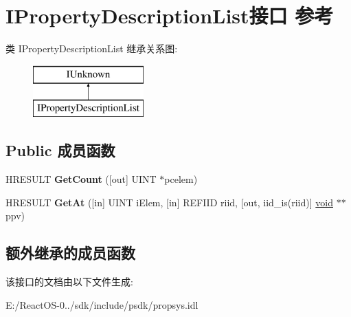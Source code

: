 \hypertarget{interface_i_property_description_list}{}\section{I\+Property\+Description\+List接口 参考}
\label{interface_i_property_description_list}
类 I\+Property\+Description\+List 继承关系图\+:\begin{figure}[H]
\begin{center}
\leavevmode
\includegraphics[height=2.000000cm]{interface_i_property_description_list}
\end{center}
\end{figure}
\subsection*{Public 成员函数}
\begin{DoxyCompactItemize}
\item 
\mbox{\label{interface_i_property_description_list_afdffe506ab32c8218f2d2d1d0a97052a}} 
H\+R\+E\+S\+U\+LT {\bfseries Get\+Count} (\mbox{[}out\mbox{]} U\+I\+NT $\ast$pcelem)
\item 
\mbox{\label{interface_i_property_description_list_a37200c4359e92ed8ea59d074d11037e1}} 
H\+R\+E\+S\+U\+LT {\bfseries Get\+At} (\mbox{[}in\mbox{]} U\+I\+NT i\+Elem, \mbox{[}in\mbox{]} R\+E\+F\+I\+ID riid, \mbox{[}out, iid\+\_\+is(riid)\mbox{]} \hyperlink{interfacevoid}{void} $\ast$$\ast$ppv)
\end{DoxyCompactItemize}
\subsection*{额外继承的成员函数}


该接口的文档由以下文件生成\+:\begin{DoxyCompactItemize}
\item 
E\+:/\+React\+O\+S-\/0../sdk/include/psdk/propsys.\+idl\end{DoxyCompactItemize}
